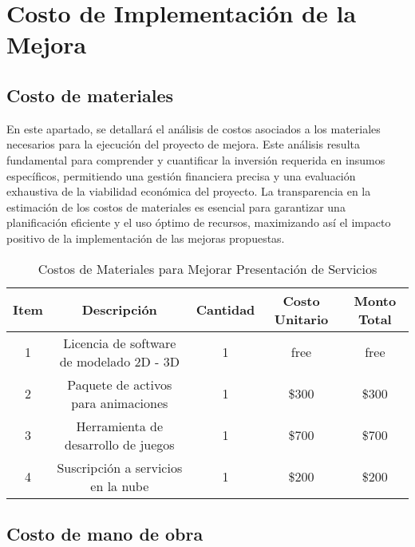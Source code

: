 \titlespacing{\chapter}{0pt}{120pt}{7pt}
\chapter{Costo de Implementación de la Mejora }
\label{cap:costo}

\section{Costo de materiales}

En este apartado, se detallará el análisis de costos asociados a los materiales necesarios 
para la ejecución del proyecto de mejora. Este análisis resulta fundamental para 
comprender y cuantificar la inversión requerida en insumos específicos, permitiendo una 
gestión financiera precisa y una evaluación exhaustiva de la viabilidad económica del 
proyecto. La transparencia en la estimación de los costos de materiales es esencial para 
garantizar una planificación eficiente y el uso óptimo de recursos, maximizando así el 
impacto positivo de la implementación de las mejoras propuestas.

\begin{table}[!ht]
    \centering
    \begin{tabular}{|c|c|c|c|c|}
    \hline
    \textbf{Item} & \textbf{Descripción} & \textbf{Cantidad} & \textbf{Costo Unitario} & \textbf{Monto Total} \\
    \hline
    1 & Licencia de software de modelado 2D -  3D & 1 & free & free \\
    \hline
    2 & Paquete de activos para animaciones & 1 & \$300 & \$300 \\
    \hline
    3 & Herramienta de desarrollo de juegos & 1 & \$700 & \$700 \\
    \hline
    4 & Suscripción a servicios en la nube & 1 & \$200 & \$200 \\
    \hline
    \end{tabular}
    \caption{Costos de Materiales para Mejorar Presentación de Servicios}
    \label{tab:costos_materiales_proefex}
\end{table}

\section{Costo de mano de obra}

